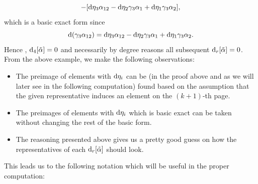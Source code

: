 \documentclass[pdftex]{sigma}
\numberwithin{equation}{section}
\theoremstyle{definition}
\begin{document}
\[-[{\rm d}\eta_3\alpha_{12}-{\rm d}\eta_2\gamma_3\alpha_1+{\rm d}\eta_1\gamma_3\alpha_2],\]
which is a basic exact form since
\[{\rm d}(\gamma_3\alpha_{12})={\rm d}\eta_3\alpha_{12}-{\rm d}\eta_2\gamma_3\alpha_1+{\rm d}\eta_1\gamma_3\alpha_2.\]
Hence , ${\rm d}_4[\tilde{\alpha}]=0$ and necessarily by degree reasons all subsequent ${\rm d}_r[\tilde{\alpha}]=0$. From the above example, we make the following observations:
\begin{itemize}\itemsep=0pt
\item The preimage of elements with ${\rm d}\eta_i$ can be (in the proof above and as we will later see in the following computation) found based on the assumption that the given representative induces an element on the $(k+1)$-th page.
\item The preimages of elements with ${\rm d}\eta_i$ which is basic exact can be taken without changing the rest of the basic form.
\item The reasoning presented above gives us a pretty good guess on how the representatives of each ${\rm d}_r[\tilde{\alpha}]$ should look.
\end{itemize}
This leads us to the following notation which will be useful in the proper computation:
\end{document}
